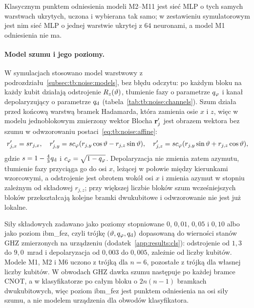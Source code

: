 Klasycznym punktem odniesienia modeli M2--M11 jest sieć MLP o tych samych warstwach ukrytych, uczona i wybierana tak samo; w zestawieniu symulatorowym jest nim sieć MLP o jednej warstwie ukrytej z $64$ neuronami, a model M1 odniesienia nie ma.

\paragraph{Model szumu i jego poziomy.}
W symulacjach stosowano model warstwowy z podrozdziału~\ref{subsec:tb:noise:models}, bez błędu odczytu: po każdym bloku na każdy kubit działają odstrojenie $R_z(\vartheta)$, tłumienie fazy o parametrze $q_{\varphi}$ i kanał depolaryzujący o parametrze $q_{\mathrm{d}}$ (tabela~\ref{tab:tb:noise:channels}).
Szum działa przed końcową warstwą bramek Hadamarda, która zamienia osie $x$ i $z$, więc w modelu jednoblokowym zmierzony wektor Blocha $\mathbf{r}_j'$ jest obrazem wektora bez szumu w odwzorowaniu postaci~\eqref{eq:tb:noise:affine}:
\begin{equation}\label{eq:cls:noise-frame}
r_{j,x}'=s r_{j,x},\quad
r_{j,y}'=s c_{\varphi}(r_{j,y}\cos\vartheta-r_{j,z}\sin\vartheta),\quad
r_{j,z}'=s c_{\varphi}(r_{j,y}\sin\vartheta+r_{j,z}\cos\vartheta),
\end{equation}
gdzie $s=1-\tfrac{4}{3}q_{\mathrm{d}}$ i $c_{\varphi}=\sqrt{1-q_{\varphi}}$.
Depolaryzacja nie zmienia zatem azymutu, tłumienie fazy przyciąga go do osi $x$, leżącej w połowie między kierunkami wzorcowymi, a odstrojenie jest obrotem wokół osi $x$ i zmienia azymut w stopniu zależnym od składowej $r_{j,z}$; przy większej liczbie bloków szum wcześniejszych bloków przekształcają kolejne bramki dwukubitowe i odwzorowanie nie jest już lokalne.

Siły składowych zadawano jako poziomy stopniowane $0$, $0{,}01$, $0{,}05$ i $0{,}10$ albo jako poziom ibm\_fez, czyli trójkę $(\vartheta,q_{\varphi},q_{\mathrm{d}})$ dopasowaną do wierności stanów GHZ zmierzonych na urządzeniu (dodatek~\ref{app:results:cls}): odstrojenie od $1{,}3$ do $9{,}0$~mrad i depolaryzacja od $0{,}003$ do $0{,}005$, zależnie od liczby kubitów.
Modele M1, M2 i M6 uczono z trójką dla $n=6$, pozostałe z trójką dla własnej liczby kubitów.
W obwodach GHZ dawka szumu następuje po każdej bramce CNOT, a w klasyfikatorze po całym bloku o $2n(n-1)$ bramkach dwukubitowych, więc poziom ibm\_fez jest punktem odniesienia na osi siły szumu, a nie modelem urządzenia dla obwodów klasyfikatora.

